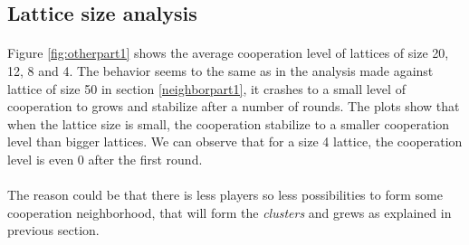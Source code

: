 \documentclass[letterpaper]{article}
\begin{document}
\subsection{Lattice size analysis}

\paragraph{}

Figure \ref{fig:otherpart1}  shows the average cooperation level
of lattices of size 20, 12, 8 and 4. The behavior seems to the same
as in the analysis made against lattice of size 50
in section \ref{neighborpart1}, it crashes to a small level of cooperation
to grows and stabilize after a number of rounds. The plots show that when
the lattice size is small, the cooperation stabilize to a smaller cooperation
level than bigger lattices. We can observe that for a size 4 lattice,
the cooperation level is even 0 after the first round.

\paragraph{}

The reason could be that there is less players so less possibilities to
form some cooperation neighborhood, that will form the \textit{clusters}
and grews as explained in previous section.
\end{document}
